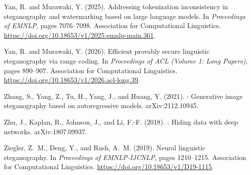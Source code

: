 \documentclass[a4paper,twoside]{article}
\begin{document}
{\begin{thebibliography}{}
Yan, R. and Murawaki, Y. (2025).
\newblock Addressing tokenization inconsistency in steganography and
  watermarking based on large language models.
\newblock In {\em Proceedings of EMNLP}, pages 7076--7098. Association for
  Computational Linguistics.
\newblock \url{https://doi.org/10.18653/v1/2025.emnlp-main.361}.

Yan, R. and Murawaki, Y. (2026).
\newblock Efficient provably secure linguistic steganography via range coding.
\newblock In {\em Proceedings of ACL (Volume 1: Long Papers)}, pages 890--907.
  Association for Computational Linguistics.
\newblock \url{https://doi.org/10.18653/v1/2026.acl-long.39}.

Zhang, S., Yang, Z., Tu, H., Yang, J., and Huang, Y. (2021).
: Generative image steganography based on autoregressive
  models.
\newblock arXiv:2112.10945.

Zhu, J., Kaplan, R., Johnson, J., and Li, F.-F. (2018).
: Hiding data with deep networks.
\newblock arXiv:1807.09937.

Ziegler, Z.~M., Deng, Y., and Rush, A.~M. (2019).
\newblock Neural linguistic steganography.
\newblock In {\em Proceedings of EMNLP-IJCNLP}, pages 1210--1215. Association
  for Computational Linguistics.
\newblock \url{https://doi.org/10.18653/v1/D19-1115}.

\end{thebibliography}
}
\end{document}
